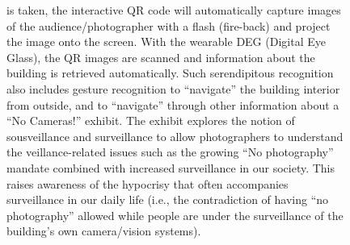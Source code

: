 \begin{figure}[!t]
{ is taken, the interactive QR code will automatically capture images of the
 audience/photographer with a flash (fire-back) and project the image onto the
 screen. With the wearable DEG (Digital Eye Glass), the QR images are
 scanned and information about the building is retrieved automatically.
 Such serendipitous recognition also includes gesture recognition to
 ``navigate'' the building interior from outside, and to ``navigate''
 through other information about a ``No Cameras!'' exhibit.
 The exhibit explores the notion of sousveillance and surveillance to
 allow photographers to understand the veillance-related issues such
 as the growing ``No photography'' mandate combined with increased surveillance
 in our society.
 This raises awareness of the hypocrisy that often accompanies
 surveillance in our daily life (i.e., the contradiction of having
 ``no photography''
 allowed while people are under the surveillance of the building's own
 camera/vision systems).
}
    \label{building}
\end{figure}

